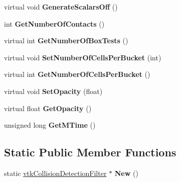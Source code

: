 \begin{DoxyCompactItemize}
\item 
\hypertarget{classvtkCollisionDetectionFilter_aa2ea37fcea72b0cae9fde2e71d23145c}{
virtual void {\bfseries GenerateScalarsOff} ()}
\label{classvtkCollisionDetectionFilter_aa2ea37fcea72b0cae9fde2e71d23145c}

\item 
\hypertarget{classvtkCollisionDetectionFilter_a909c0634a5922f3cc89128759d10f583}{
int {\bfseries GetNumberOfContacts} ()}
\label{classvtkCollisionDetectionFilter_a909c0634a5922f3cc89128759d10f583}

\item 
\hypertarget{classvtkCollisionDetectionFilter_a1a8e811be18a92ea844c8a880c4f23c9}{
virtual int {\bfseries GetNumberOfBoxTests} ()}
\label{classvtkCollisionDetectionFilter_a1a8e811be18a92ea844c8a880c4f23c9}

\item 
\hypertarget{classvtkCollisionDetectionFilter_aba14e6a67067b97777ace50431376745}{
virtual void {\bfseries SetNumberOfCellsPerBucket} (int)}
\label{classvtkCollisionDetectionFilter_aba14e6a67067b97777ace50431376745}

\item 
\hypertarget{classvtkCollisionDetectionFilter_a900110c0dfaed5d31fb82eedd4976e22}{
virtual int {\bfseries GetNumberOfCellsPerBucket} ()}
\label{classvtkCollisionDetectionFilter_a900110c0dfaed5d31fb82eedd4976e22}

\item 
\hypertarget{classvtkCollisionDetectionFilter_a8eda10c7bb5dd096311b0b7cb71c6d7a}{
virtual void {\bfseries SetOpacity} (float)}
\label{classvtkCollisionDetectionFilter_a8eda10c7bb5dd096311b0b7cb71c6d7a}

\item 
\hypertarget{classvtkCollisionDetectionFilter_aad6974110a3b0f42fc4fae0578e777d1}{
virtual float {\bfseries GetOpacity} ()}
\label{classvtkCollisionDetectionFilter_aad6974110a3b0f42fc4fae0578e777d1}

\item 
\hypertarget{classvtkCollisionDetectionFilter_a002a7e0830197e208f5c8773622a3d24}{
unsigned long {\bfseries GetMTime} ()}
\label{classvtkCollisionDetectionFilter_a002a7e0830197e208f5c8773622a3d24}

\end{DoxyCompactItemize}
\subsection*{Static Public Member Functions}
\begin{DoxyCompactItemize}
\item 
\hypertarget{classvtkCollisionDetectionFilter_a3ba83f0f8879106d66ef68c4831ff513}{
static \hyperlink{classvtkCollisionDetectionFilter}{vtkCollisionDetectionFilter} $\ast$ {\bfseries New} ()}
\label{classvtkCollisionDetectionFilter_a3ba83f0f8879106d66ef68c4831ff513}

\end{DoxyCompactItemize}
